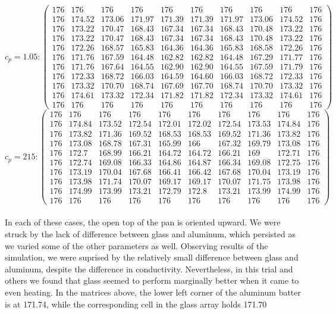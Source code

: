 \documentclass[12pt]{reedmcm}
\begin{document}
\[c_p = 1.05: \begin{pmatrix} 176&176&176&176&176&176&176&176&176&176\\
176&174.52&173.06&171.97&171.39&171.39&171.97&173.06&174.52&176\\
176&173.22&170.47&168.43&167.34&167.34&168.43&170.48&173.22&176\\
176&173.22&170.47&168.43&167.34&167.34&168.43&170.48&173.22&176\\
176&172.26&168.57&165.83&164.36&164.36&165.83&168.58&172.26&176\\
176&171.76&167.59&164.48&162.82&162.82&164.48&167.29&171.77&176\\
176&171.76&167.64&164.55&162.90&162.90&164.55&167.59&171.79&176\\
176&172.33&168.72&166.03&164.59&164.60&166.03&168.72&172.33&176\\
176&173.32&170.70&168.74&167.69&167.70&168.74&170.70&173.32&176\\
176&174.61&173.32&172.34&171.82&171.82&172.34&173.32&174.61&176\\
176&176&176&176&176&176&176&176&176&176\end{pmatrix}\]
\[c_p = 215: \begin{pmatrix} 176&176&176&176&176&176&176&176&176&176\\
176&174.84&173.52&172.54&172.01&172.02&172.54&173.53&174.84&176\\
176&173.82&171.36&169.52&168.53&168.53&169.52&171.36&173.82&176\\
176&173.08&168.78&167.31&165.99&166&167.32&169.79&173.08&176\\
176&172.7&168.99&166.21&164.72&164.72&166.21&169&172.71&176\\
176&172.74&169.08&166.33&164.86&164.87&166.34&169.08&172.75&176\\
176&173.19&170.04&167.68&166.41&166.42&167.68&170.04&173.19&176\\
176&173.98&171.74&170.07&169.17&169.17&170.07&171.75&173.98&176\\
176&174.99&173.99&173.21&172.79&172.8&173.21&173.99&174.99&176\\
176&176&176&176&176&176&176&176&176&176 \end{pmatrix}\]
\\
In each of these cases, the open top of the pan is oriented upward.  We were struck by the lack of difference between glass and aluminum, which persisted as we varied some of the other parameters as well. Observing results of the simulation, we were suprised by the relatively small difference between glass and aluminum, despite the difference in conductivity.  Nevertheless, in this trial and others we found that glass seemed to perform marginally better when it came to even heating.  In the matrices above, the lower left corner of the aluminum batter is at 171.74, while the corresponding cell in the glass array holds 171.70
\end{document}
